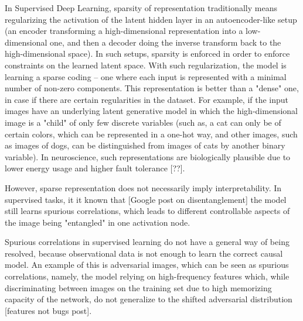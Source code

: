 \documentclass[a4paper,11pt,oneside]{report}
\begin{document}
In Supervised Deep Learning, sparsity of representation traditionally means regularizing the activation of the latent hidden layer in an autoencoder-like setup (an encoder transforming a high-dimensional representation into a low-dimensional one, and then a decoder doing the inverse transform back to the high-dimensional space). In such setups, sparsity is enforced in order to enforce constraints on the learned latent space. With such regularization, the model is learning a sparse coding -- one where each input is represented with a minimal number of non-zero components.
This representation is better than a "dense" one, in case if there are certain regularities in the dataset.
For example, if the input images have an underlying latent generative model in which the high-dimensional image is a "child" of only few discrete variables (such as, a cat can only be of certain colors, which can be represented in a one-hot way, and other images, such as images of dogs, can be distinguished from images of cats by another binary variable).
In neuroscience, such representations are biologically plausible due to lower energy usage and higher fault tolerance [??].

However, sparse representation does not necessarily imply interpretability. In supervised tasks, it it known that [Google post on disentanglement] the model still learns spurious correlations, which leads to different controllable aspects of the image being "entangled" in one activation node.

Spurious correlations in supervised learning do not have a general way of being resolved, because observational data is not enough to learn the correct causal model. An example of this is adversarial images, which can be seen as spurious correlations, namely, the model relying on high-frequency features which, while discriminating between images on the training set due to high memorizing capacity of the network, do not generalize to the shifted adversarial distribution [features not bugs post].
\end{document}
